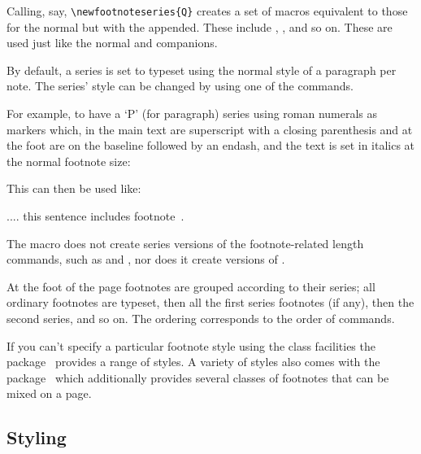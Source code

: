     Calling, say, \verb?\newfootnoteseries{Q}? creates a set of macros
equivalent to those for the normal \cmd{\footnote} but with the 
appended. These include , ,
 and so on. These are used just like the normal
\cmd{\footnote} and companions.

    By default, a series is set to typeset using the normal style
of a paragraph per note. The series' style can be changed by using one
of the  commands.

    For example, to have a `P' (for paragraph) series using roman numerals 
as markers which, in the main text are superscript with a closing parenthesis
and at the foot are on the baseline followed by an endash, and the text is
set in italics at the normal footnote size:
\begin{lcode}
\renewcommand{\thefootnoteP}{\roman{footnoteP}}
\renewcommand{\@makefnmarkP}{%
              \hbox{\textsuperscript{\@thefnmarkP)}}}
\renewcommand{\foottextfontP}{\itshape\footnotesize}
\end{lcode}
This can then be used like:
\begin{lcode}
.... this sentence 
includes footnote~.
\end{lcode}

   The \cmd{\newfootnoteseries} macro does not create series versions
of the footnote-related length commands, such as \lnc{\footmarkwidth}
and \lnc{\footmarksep}, nor does it create versions of \cmd{\footnoterule}.

   At the foot of the page footnotes are grouped according to their series;
all ordinary footnotes are typeset, then all the first series footnotes 
(if any), then the second series, and so on. The ordering corresponds to
the order of \cmd{\newfootnoteseries} commands.

     If you can't specify a particular footnote style using the
class facilities the 
package~\cite{FOOTMISC} provides a range of styles. 
A variety of styles also comes with the  package~\cite{LEDMAC} 
which additionally provides several classes of footnotes that can be mixed
on a page.



\subsection{Styling}

